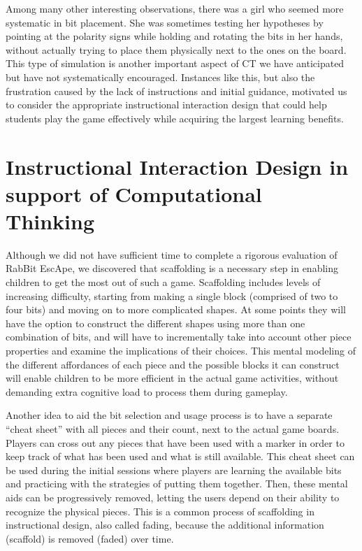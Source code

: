 \documentclass{acm_proc_article-sp}
\begin{document}
Among many other interesting observations, there was a girl who seemed more systematic in bit placement. 
She was sometimes testing her hypotheses by pointing at the polarity signs while holding and rotating the bits in her hands, without actually trying to place them physically next to the ones on the board. 
This type of simulation is another important aspect of CT we have anticipated but have not systematically encouraged. 
Instances like this, but also the frustration caused by the lack of instructions and initial guidance, motivated us to consider the appropriate instructional interaction design that could help students play the game effectively while acquiring the largest learning benefits.

\section{\sloppy Instructional Interaction Design in support of Computational Thinking}
\label{sec:instructional_design}
Although we did not have sufficient time to complete a rigorous evaluation of RabBit EscApe, we discovered that scaffolding is a necessary step in enabling children to get the most out of such a game. 
Scaffolding includes levels of increasing difficulty, starting from making a single block (comprised of two to four bits) and moving on to more complicated shapes. 
At some points they will have the option to construct the different shapes using more than one combination of bits, and will have to incrementally take into account other piece properties and examine the implications of their choices. 
This mental modeling of the different affordances of each piece and the possible blocks it can construct will enable children to be more efficient in the actual game activities, without demanding extra cognitive load to process them during gameplay. 

Another idea to aid the bit selection and usage process is to have a separate ``cheat sheet'' with all pieces and their count, next to the actual game boards. 
Players can cross out any pieces that have been used with a marker in order to keep track of what has been used and what is still available. 
This cheat sheet can be used during the initial sessions where players are learning the available bits and practicing with the strategies of putting them together. 
Then, these mental aids can be progressively removed, letting the users depend on their ability to recognize the physical pieces. 
This is a common process of scaffolding in instructional design, also called fading, because the additional information (scaffold) is removed (faded) over time. 
\end{document}
